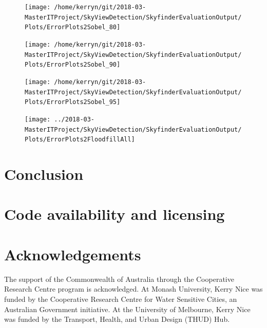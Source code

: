 \documentclass[final,3p,times,authoryear]{elsarticle}
\begin{document}
\begin{figure}
\centering
\texttt{[image: /home/kerryn/git/2018-03-MasterITProject/SkyViewDetection/SkyfinderEvaluationOutput/Plots/ErrorPlots2Sobel\_80]}
\caption{}
\label{fig:errorplots2sobel80}
\end{figure}
\begin{figure}
\centering
\texttt{[image: /home/kerryn/git/2018-03-MasterITProject/SkyViewDetection/SkyfinderEvaluationOutput/Plots/ErrorPlots2Sobel\_90]}
\caption{}
\label{fig:errorplots2sobel90}
\end{figure}
\begin{figure}
\centering
\texttt{[image: /home/kerryn/git/2018-03-MasterITProject/SkyViewDetection/SkyfinderEvaluationOutput/Plots/ErrorPlots2Sobel\_95]}
\caption{}
\label{fig:errorplots2sobel95}
\end{figure}

\begin{figure}
\centering
\texttt{[image: ../2018-03-MasterITProject/SkyViewDetection/SkyfinderEvaluationOutput/Plots/ErrorPlots2FloodfillAll]}
\caption{}
\label{fig:errorplots2floodfillall}
\end{figure}











\section{Conclusion}\label{sec:conclusion}


\section{Code availability and licensing}\label{sec:available}





\section*{Acknowledgements}
The support of the Commonwealth of Australia through the Cooperative Research Centre program is acknowledged. At Monash University, Kerry Nice was funded by the Cooperative Research Centre for Water Sensitive Cities, an Australian Government initiative. At the University of Melbourne, Kerry Nice was funded by the Transport, Health, and Urban Design (THUD) Hub. 
 
\end{document}
